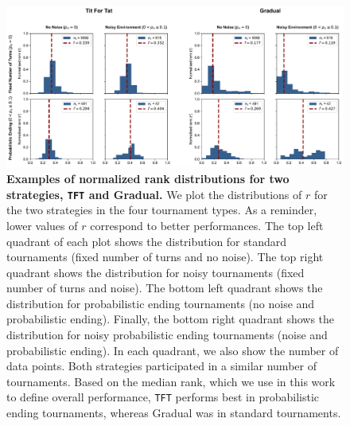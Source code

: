 \documentclass{article}
\def\TFT{\texttt{TFT}}
\begin{document}
\begin{figure}[!htbp]
    \centering
    \includegraphics[width=\textwidth]{../images/normalised_rank_distributions.pdf}
    \caption{\textbf{Examples of normalized rank distributions for two
    strategies, \TFT{} and Gradual.} We plot the distributions of \(r\) for the
    two strategies in the four tournament types. As a reminder, lower values of
    \(r\) correspond to better performances. The top left quadrant of each plot
    shows the distribution for standard tournaments (fixed number of turns and
    no noise). The top right quadrant shows the distribution for noisy
    tournaments (fixed number of turns and noise). The bottom left quadrant
    shows the distribution for probabilistic ending tournaments (no noise and
    probabilistic ending). Finally, the bottom right quadrant shows the
    distribution for noisy probabilistic ending tournaments (noise and
    probabilistic ending). In each quadrant, we also show the number of data
    points. Both strategies participated in a similar number of tournaments.
    Based on the median rank, which we use in this work to define overall
    performance, \TFT{} performs best in probabilistic ending tournaments,
    whereas Gradual was in standard tournaments.}
    \label{fig:normalised_rank_distributions}
\end{figure}
\end{document}
